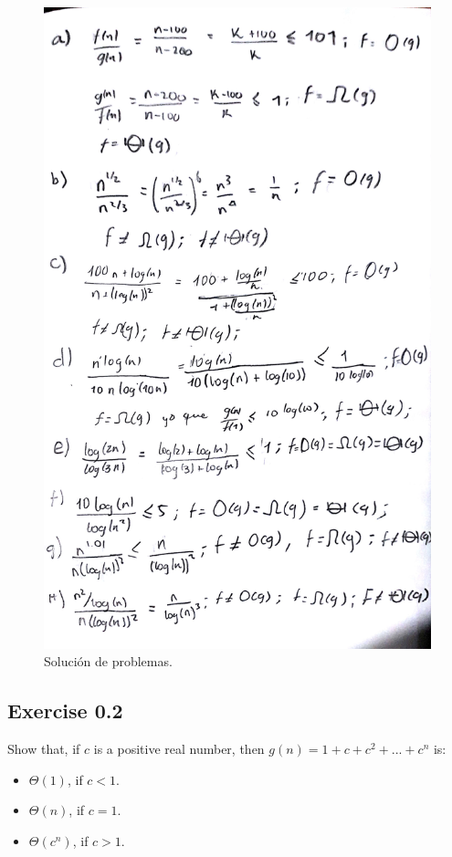 \documentclass{article}
\begin{document}
\begin{figure}[H]
  \centering
  \includegraphics[width=\textwidth]{./img/DVP1}
  \caption{Solución de problemas.}
  \label{fig:DVP1}
\end{figure}

\subsection{Exercise 0.2}
Show that, if $c$ is a positive real number, then $g(n) = 1 + c + c^2 + ... + c^n$ is:

\begin{itemize}
	\item $\Theta(1)$, if $c < 1$.
	\item $\Theta(n)$, if $c = 1$.
	\item $\Theta(c^n)$, if $c > 1$.
\end{itemize}
\end{document}
